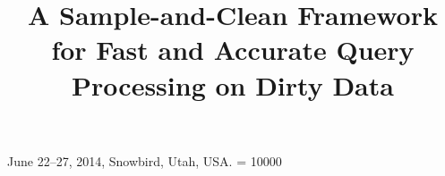 \documentclass[english]{sig-alternate}
\begin{document}
 {June 22--27, 2014, Snowbird, Utah, USA.}
\widowpenalty = 10000





\title{A Sample-and-Clean Framework for Fast and Accurate Query Processing on Dirty Data}



\newtheorem{theorem}{Theorem}
\newtheorem{example}{Example}
\newtheorem{definition}{Definition}
\newtheorem{proposition}{Proposition}
\newtheorem{lemma}{Lemma}
\newtheorem{corollary}{Corollary}

\newcommand{\dataset}{data set\xspace}
\newcommand{\datasets}{data sets\xspace}
\newcommand{\biascorrected}{NormalizedSC\xspace}
\newcommand{\bias}{\biascorrected}
\newcommand{\sampledirty}{{NormalizedSC}\xspace}
\newcommand{\sampleclean}{{RawSC}\xspace}
\newcommand{\allclean}{{AllClean}\xspace}
\newcommand{\alldirty}{{AllDirty}\xspace}
\newcommand{\projx}{\textsc{BlinkCrowdDB}\xspace}
\newcommand{\saqp}{SAQP\xspace}


\newcommand{\saqpplus}{\textsf{SampleClean}\xspace}
\newcommand{\blinkdb}{BlinkDB\xspace}
\newcommand{\ctable}{\ensuremath{T^{clean}}\xspace}
\newcommand{\var}{\ensuremath{\texttt{var}}\xspace}


\newcommand{\Verror}{{Value error}\xspace}
\newcommand{\Cerror}{{Condition error}\xspace}
\newcommand{\Derror}{{Duplication error}\xspace}

\newcommand{\verror}{{value error}\xspace}
\newcommand{\cerror}{{condition error}\xspace}
\newcommand{\derror}{{duplication error}\xspace}

\newcommand{\Verrors}{{Value errors}\xspace}
\newcommand{\Cerrors}{{Condition errors}\xspace}
\newcommand{\Derrors}{{Duplication errors}\xspace}
\end{document}
